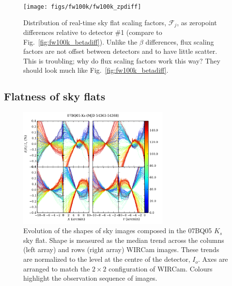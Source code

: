 \documentclass[iop]{emulateapj}
\newcommand{\todo}[1]{\textcolor{RedOrange}{#1}} %
\newcommand{\Fig}[1]{Fig.~\ref{fig:#1}}  %
\begin{document}
\begin{figure}[t]
\centering
\texttt{[image: figs/fw100k/fw100k\_zpdiff]}
\caption{Distribution of real-time sky flat scaling factors, $\mathcal{F}_j$, as zeropoint differences relative to detector \#1 (compare to \Fig{fw100k_betadiff}).
Unlike the $\beta$ differences, flux scaling factors are not offset between detectors and to have little scatter.
\todo{This is troubling; why do flux scaling factors work this way? They should look much like \Fig{fw100k_betadiff}.}}
\label{fig:fw100k_zpdiff}
\end{figure}

\subsection{Flatness of sky flats}
\label{sec:skyflatshapes}

\begin{figure}[t]
    \centering
        \includegraphics[width=3in]{figs/07BQ05_Ks.pdf}
    \caption{Evolution of the shapes of sky images composed in the 07BQ05 $K_s$ sky flat. Shape is measured as the median trend across the columns (left array) and rows (right array) WIRCam images. These trends are normalized to the level at the centre of the detector, $I_o$. Axes are arranged to match the $2 \times 2$ configuration of WIRCam. Colours highlight the observation sequence of images.}
    \label{fig:flat_07BQ05_Ks}
\end{figure}

\end{document}

